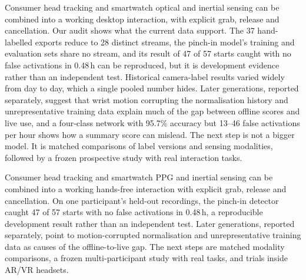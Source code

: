 
\label{conclusion}

\iffull
Consumer head tracking and smartwatch optical and inertial sensing can be combined into a working desktop interaction, with explicit grab, release and cancellation. Our audit shows what the current data support. The 37 hand-labelled exports reduce to 28 distinct streams, the pinch-in model's training and evaluation sets share no stream, and its result of 47 of 57 starts caught with no false activations in 0.48\,h can be reproduced, but it is development evidence rather than an independent test. Historical camera-label results varied widely from day to day, which a single pooled number hides. Later generations, reported separately, suggest that wrist motion corrupting the normalisation history and unrepresentative training data explain much of the gap between offline scores and live use, and a four-class network with 95.7\% accuracy but 13--46 false activations per hour shows how a summary score can mislead. The next step is not a bigger model. It is matched comparisons of label versions and sensing modalities, followed by a frozen prospective study with real interaction tasks.

\else
Consumer head tracking and smartwatch PPG and inertial sensing can be combined into a working hands-free interaction with explicit grab, release and cancellation. On one participant's held-out recordings, the pinch-in detector caught 47 of 57 starts with no false activations in 0.48\,h, a reproducible development result rather than an independent test. Later generations, reported separately, point to motion-corrupted normalisation and unrepresentative training data as causes of the offline-to-live gap. The next steps are matched modality comparisons, a frozen multi-participant study with real tasks, and trials inside AR/VR headsets.
\fi